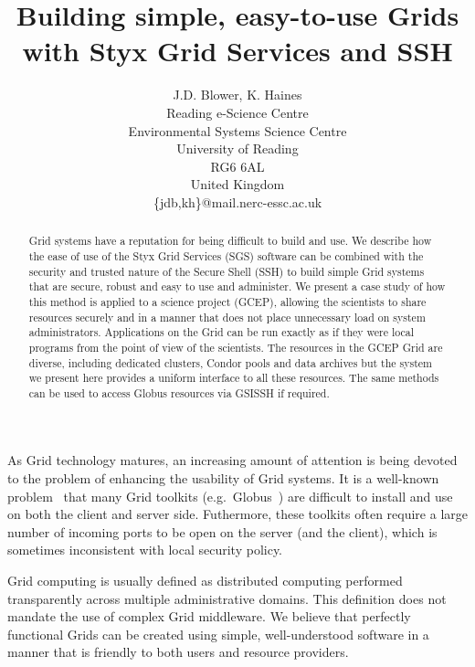 \documentclass[times,10pt,twocolumn]{article}
\begin{document}
\title{Building simple, easy-to-use Grids with Styx Grid Services and SSH}

\author{
J.D. Blower, K. Haines\\
Reading e-Science Centre\\
Environmental Systems Science Centre\\
University of Reading\\
RG6 6AL\\
United Kingdom\\
\{jdb,kh\}@mail.nerc-essc.ac.uk
}

\maketitle
\thispagestyle{empty}

\begin{abstract}
Grid systems have a reputation for being difficult to build and use.  We describe how the ease of use of the Styx Grid Services (SGS) software can be combined with the security and trusted nature of the Secure Shell (SSH) to build simple Grid systems that are secure, robust and easy to use and administer.  We present a case study of how this method is applied to a science project (GCEP), allowing the scientists to share resources securely and in a manner that does not place unnecessary load on system administrators.  Applications on the Grid can be run exactly as if they were local programs from the point of view of the scientists.  The resources in the GCEP Grid are diverse, including dedicated clusters, Condor pools and data archives but the system we present here provides a uniform interface to all these resources.  The same methods can be used to access Globus resources via GSISSH if required.
\end{abstract}



As Grid technology matures, an increasing amount of attention is being devoted to the problem of enhancing the usability of Grid systems.  It is a well-known problem~\cite{chin:2004} that many Grid toolkits (e.g.\ Globus~\cite{globustoolkit}) are difficult to install and use on both the client and server side.  Futhermore, these toolkits often require a large number of incoming ports to be open on the server (and the client), which is sometimes inconsistent with local security policy.

Grid computing is usually defined as distributed computing performed transparently across multiple administrative domains.  This definition does not mandate the use of complex Grid middleware.  We believe that perfectly functional Grids can be created using simple, well-understood software in a manner that is friendly to both users and resource providers.
\end{document}
